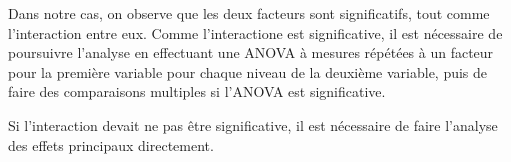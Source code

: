 \documentclass[
]{book}
\begin{document}
Dans notre cas, on observe que les deux facteurs sont significatifs, tout comme l'interaction entre eux. Comme l'interactione est significative, il est nécessaire de poursuivre l'analyse en effectuant une ANOVA à mesures répétées à un facteur pour la première variable pour chaque niveau de la deuxième variable, puis de faire des comparaisons multiples si l'ANOVA est significative.

Si l'interaction devait ne pas être significative, il est nécessaire de faire l'analyse des effets principaux directement.

  
\end{document}
